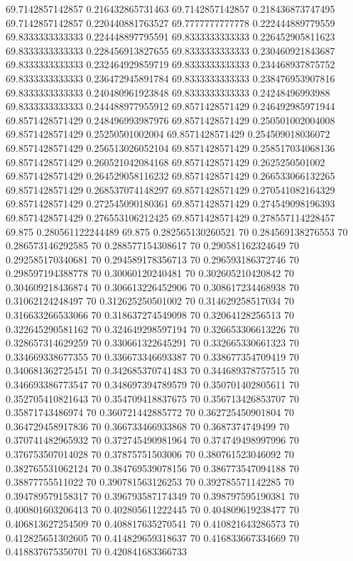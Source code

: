{69.7142857142857 0.216432865731463
69.7142857142857 0.218436873747495
69.7142857142857 0.220440881763527
69.7777777777778 0.222444889779559
69.8333333333333 0.224448897795591
69.8333333333333 0.226452905811623
69.8333333333333 0.228456913827655
69.8333333333333 0.230460921843687
69.8333333333333 0.232464929859719
69.8333333333333 0.234468937875752
69.8333333333333 0.236472945891784
69.8333333333333 0.238476953907816
69.8333333333333 0.240480961923848
69.8333333333333 0.24248496993988
69.8333333333333 0.244488977955912
69.8571428571429 0.246492985971944
69.8571428571429 0.248496993987976
69.8571428571429 0.250501002004008
69.8571428571429 0.25250501002004
69.8571428571429 0.254509018036072
69.8571428571429 0.256513026052104
69.8571428571429 0.258517034068136
69.8571428571429 0.260521042084168
69.8571428571429 0.2625250501002
69.8571428571429 0.264529058116232
69.8571428571429 0.266533066132265
69.8571428571429 0.268537074148297
69.8571428571429 0.270541082164329
69.8571428571429 0.272545090180361
69.8571428571429 0.274549098196393
69.8571428571429 0.276553106212425
69.8571428571429 0.278557114228457
69.875 0.280561122244489
69.875 0.282565130260521
70 0.284569138276553
70 0.286573146292585
70 0.288577154308617
70 0.290581162324649
70 0.292585170340681
70 0.294589178356713
70 0.296593186372746
70 0.298597194388778
70 0.30060120240481
70 0.302605210420842
70 0.304609218436874
70 0.306613226452906
70 0.308617234468938
70 0.31062124248497
70 0.312625250501002
70 0.314629258517034
70 0.316633266533066
70 0.318637274549098
70 0.32064128256513
70 0.322645290581162
70 0.324649298597194
70 0.326653306613226
70 0.328657314629259
70 0.330661322645291
70 0.332665330661323
70 0.334669338677355
70 0.336673346693387
70 0.338677354709419
70 0.340681362725451
70 0.342685370741483
70 0.344689378757515
70 0.346693386773547
70 0.348697394789579
70 0.350701402805611
70 0.352705410821643
70 0.354709418837675
70 0.356713426853707
70 0.35871743486974
70 0.360721442885772
70 0.362725450901804
70 0.364729458917836
70 0.366733466933868
70 0.3687374749499
70 0.370741482965932
70 0.372745490981964
70 0.374749498997996
70 0.376753507014028
70 0.37875751503006
70 0.380761523046092
70 0.382765531062124
70 0.384769539078156
70 0.386773547094188
70 0.38877755511022
70 0.390781563126253
70 0.392785571142285
70 0.394789579158317
70 0.396793587174349
70 0.398797595190381
70 0.400801603206413
70 0.402805611222445
70 0.404809619238477
70 0.406813627254509
70 0.408817635270541
70 0.410821643286573
70 0.412825651302605
70 0.414829659318637
70 0.416833667334669
70 0.418837675350701
70 0.420841683366733
}
